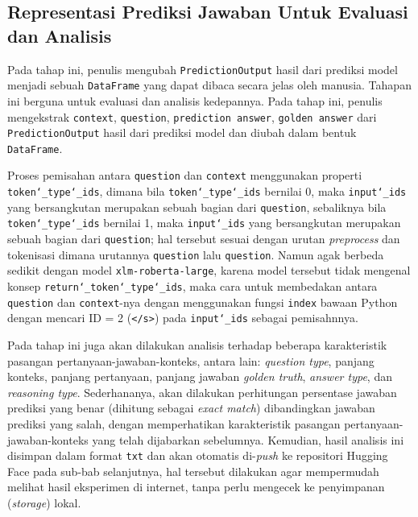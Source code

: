 \subsection{Representasi Prediksi Jawaban Untuk Evaluasi dan Analisis}
\label{4.2.10}
Pada tahap ini, penulis mengubah \texttt{PredictionOutput} hasil dari prediksi model menjadi sebuah \texttt{DataFrame} yang dapat dibaca secara jelas oleh manusia. Tahapan ini berguna untuk evaluasi dan analisis kedepannya. Pada tahap ini, penulis mengekstrak \texttt{context}, \texttt{question}, \texttt{prediction answer}, \texttt{golden answer} dari \texttt{PredictionOutput} hasil dari prediksi model dan diubah dalam bentuk \texttt{DataFrame}. 

Proses pemisahan antara \texttt{question} dan \texttt{context} menggunakan properti \texttt{token\char`_type\char`_ids}, dimana bila \texttt{token\char`_type\char`_ids} bernilai 0, maka \texttt{input\char`_ids} yang bersangkutan merupakan sebuah bagian dari \texttt{question}, sebaliknya bila \texttt{token\char`_type\char`_ids} bernilai 1, maka \texttt{input\char`_ids} yang bersangkutan merupakan sebuah bagian dari \texttt{question}; hal tersebut sesuai dengan urutan \emph{preprocess} dan tokenisasi dimana urutannya \texttt{question} lalu \texttt{question}. Namun agak berbeda sedikit dengan model \texttt{xlm-roberta-large}, karena model tersebut tidak mengenal konsep \texttt{return\char`_token\char`_type\char`_ids}, maka cara untuk membedakan antara \texttt{question} dan \texttt{context}-nya dengan menggunakan fungsi \texttt{index} bawaan Python dengan mencari ID = 2 (\texttt{</s>}) pada \texttt{input\char`_ids} sebagai pemisahnnya. 

Pada tahap ini juga akan dilakukan analisis terhadap beberapa karakteristik pasangan pertanyaan-jawaban-konteks, antara lain: \emph{question type}, panjang konteks, panjang pertanyaan, panjang jawaban \emph{golden truth}, \emph{answer type}, dan \emph{reasoning type}. Sederhananya, akan dilakukan perhitungan persentase jawaban prediksi yang benar (dihitung sebagai \emph{exact match}) dibandingkan jawaban prediksi yang salah, dengan memperhatikan karakteristik pasangan pertanyaan-jawaban-konteks yang telah dijabarkan sebelumnya. Kemudian, hasil analisis ini disimpan dalam format \texttt{txt} dan akan otomatis di-\emph{push} ke repositori Hugging Face pada sub-bab selanjutnya, hal tersebut dilakukan agar mempermudah melihat hasil eksperimen di internet, tanpa perlu mengecek ke penyimpanan (\emph{storage}) lokal.

